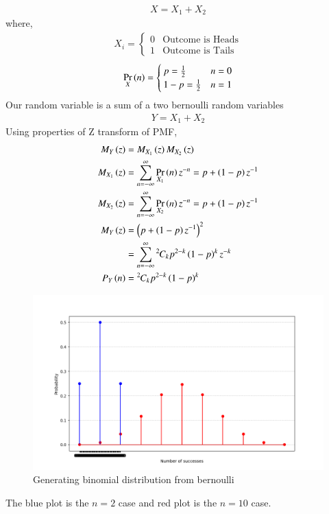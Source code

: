 \documentclass[journal]{IEEEtran}
\begin{document}
\begin{align}
  X = X_1 + X_2
\end{align}
where,
\begin{align}
	X_i = \begin{cases}
		0 & \text{Outcome is Heads}\\	
		1 & \text{Outcome is Tails}	
	\end{cases}
\end{align}
\begin{align}
  \Pr_X\left(n\right) = \begin{cases}
    p = \frac{1}{2} & n = 0\\
    1-p = \frac{1}{2} & n = 1
  \end{cases}
\end{align}
Our random variable is a sum of a two bernoulli random variables
\begin{align}
  Y = X_1 + X_2
\end{align}
Using properties of Z transform of PMF,
\begin{align}
  M_Y\left(z\right) &= M_{X_1}\left(z\right)M_{X_2}\left(z\right)\\
  M_{X_1}\left(z\right) &= \sum_{n = -\infty}^{\infty} \Pr_{X_1}\left(n\right)z^{-n} = p + \left(1-p\right)z^{-1}\\
  M_{X_2}\left(z\right) &= \sum_{n = -\infty}^{\infty} \Pr_{X_2}\left(n\right)z^{-n} = p + \left(1-p\right)z^{-1}\\
  M_Y\left(z\right) &= \left(p + \left(1-p\right)z^{-1}\right)^2\\
              &= \sum_{n = -\infty}^{\infty} {{}^{2}\mkern-1muC_{k}}p^{2-k}\left(1-p\right)^{k}z^{-k}\\
  P_Y\left(n\right) &= {{}^{2}\mkern-1muC_{k}} p^{2-k}\left(1-p\right)^k
\end{align}
\begin{figure}[h!]
   \centering
   \includegraphics[width=0.7\columnwidth]{figs/binomial.png}
    \caption{Generating binomial distribution from bernoulli}
\end{figure}
The blue plot is the $n = 2$ case and red plot is the $n = 10$ case.
\end{document}
